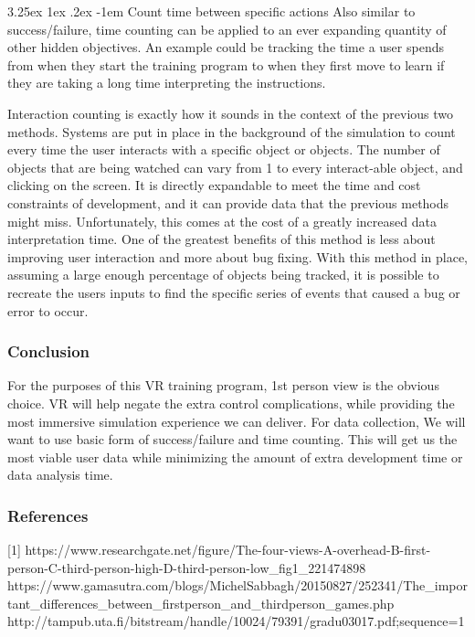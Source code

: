 \documentclass[onecolumn, draftclsnofoot,10pt, compsoc]{IEEEtran}
\makeatletter
\newcounter{subsubsubsection}[subsubsection]
\renewcommand\paragraph{\@startsection{paragraph}{5}{\z@}%
  {3.25ex \@plus1ex \@minus.2ex}%
  {-1em}%
  {\normalfont\normalsize\bfseries}}
\makeatother
\begin{document}
\paragraph{Count time between specific actions}
Also similar to success/failure, time counting can be applied to an ever expanding quantity of other hidden objectives. An example could be tracking the time a user spends from when they start the training program to when they first move to learn if they are taking a long time interpreting the instructions.


Interaction counting is exactly how it sounds in the context of the previous two methods. Systems are put in place in the background of the simulation to count every time the user interacts with a specific object or objects. The number of objects that are being watched can vary from 1 to every interact-able object, and clicking on the screen. It is directly expandable to meet the time and cost constraints of development, and it can provide data that the previous methods might miss. Unfortunately, this comes at the cost of a greatly increased data interpretation time. One of the greatest benefits of this method is less about improving user interaction and more about bug fixing. With this method in place, assuming a large enough percentage of objects being tracked, it is possible to recreate the users inputs to find the specific series of events that caused a bug or error to occur. 


\subsubsection*{Conclusion}
For the purposes of this VR training program, 1st person view is the obvious choice. VR will help negate the extra control complications, while providing the most immersive simulation experience we can deliver. For data collection, We will want to use basic form of success/failure and time counting. This will get us the most viable user data while minimizing the amount of extra development time or data analysis time. 

\newpage
\subsubsection*{References}
[1] https://www.researchgate.net/figure/The-four-views-A-overhead-B-first-person-C-third-person-high-D-third-person-low\_fig1\_221474898
\break
[2]  https://www.gamasutra.com/blogs/MichelSabbagh/20150827/252341/The\_important\_differences\_between\_firstperson\_and\_thirdperson\_games.php
\break
[3]  http://tampub.uta.fi/bitstream/handle/10024/79391/gradu03017.pdf;sequence=1
\end{document}
